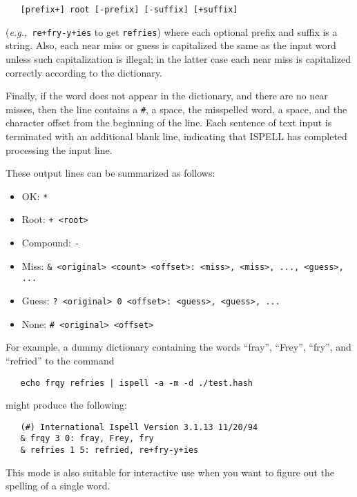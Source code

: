 \begin{itemize}
\begin{verbatim}
   [prefix+] root [-prefix] [-suffix] [+suffix]
\end{verbatim}

({\it{e.g.,}}\ \verb=re+fry-y+ies= to get \verb+refries+) where each optional
prefix and suffix is a string.
Also, each near miss or guess is capitalized the same as the input word unless
such capitalization is illegal; in the latter case each near miss is
capitalized correctly according to the dictionary.

Finally, if the word does not appear in the dictionary, and there are no
near misses, then the line contains a \verb+#+, a space, the misspelled word, a
space, and the character offset from the beginning of the line.
Each sentence of text input is terminated with an additional blank line,
indicating that ISPELL has completed processing the input line.

These output lines can be summarized as follows:

\begin{itemize}
   \item OK:
       \verb+*+
   \item Root:
       \verb-+ <root>-
   \item Compound:
       \verb+-+
   \item Miss:
       \verb+& <original> <count> <offset>: <miss>, <miss>, ..., <guess>, ...+
   \item Guess:
       \verb+? <original> 0 <offset>: <guess>, <guess>, ...+
   \item None:
       \verb+# <original> <offset>+
\end{itemize}

For example, a dummy dictionary containing the words ``fray'', ``Frey'',
``fry'', and ``refried'' to the command

\begin{verbatim}
   echo frqy refries | ispell -a -m -d ./test.hash
\end{verbatim}

might produce the following:

\begin{verbatim}
   (#) International Ispell Version 3.1.13 11/20/94
   & frqy 3 0: fray, Frey, fry
   & refries 1 5: refried, re+fry-y+ies
\end{verbatim}

This mode is also suitable for interactive use when you want to figure out
the spelling of a single word.


\end{itemize}
